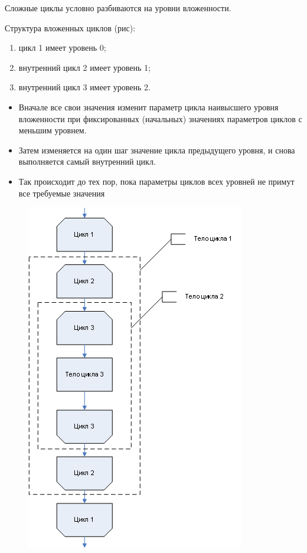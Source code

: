 \documentclass{beamer}
\begin{document}
\begin{frame}[fragile]
Сложные циклы условно разбиваются на уровни вложенности.
\begin{minipage}{0.6\textwidth}
\begin{flushleft}
Структура вложенных циклов (рис):
\begin{enumerate}
\item цикл 1 имеет уровень 0;
\item внутренний цикл 2 имеет уровень 1;
\item внутренний цикл 3 имеет уровень 2.
\end{enumerate}
\begin{itemize}
\item Вначале все свои значения изменит параметр цикла наивысшего уровня вложенности при фиксированных (начальных) значениях параметров циклов с меньшим уровнем. 
\item Затем изменяется на один шаг значение цикла предыдущего уровня, и снова выполняется самый внутренний цикл. 
\item Так происходит до тех пор, пока параметры циклов всех уровней не примут все требуемые значения
\end{itemize}
\end{flushleft}
\end{minipage}
\begin{minipage}{0.2\textwidth}
\begin{flushright}
\begin{figure}[h]
\includegraphics[scale=0.5]{images/lec04-pic11.png}
\end{figure}
\end{flushright}
\end{minipage}
\end{frame}
\end{document}
